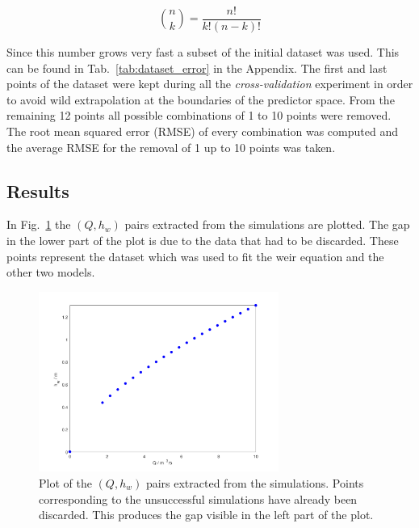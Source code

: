 \begin{equation}
  \binom{n}{k} = \frac{n!}{k!\left(n-k\right)!}
\end{equation}

\noindent Since this number grows very fast a subset of the initial dataset was used.
This can be found in Tab.~\ref{tab:dataset_error} in the Appendix.
The first and last points of the dataset were kept during all the \emph{cross-validation} experiment in order to avoid wild extrapolation at the boundaries of the predictor space.
From the remaining \num{12} points all possible combinations of \num{1} to \num{10} points were removed.
The root mean squared error (RMSE) of every combination was computed and the average RMSE for the removal of \num{1} up to \num{10} points was taken.


\subsection{Results}


In Fig.~\ref{fig:simulations_results} the $(Q, h_w)$ pairs extracted from the simulations are plotted.
The gap in the lower part of the plot is due to the data that had to be discarded.
These points represent the dataset which was used to fit the weir equation and the other two models.

\begin{figure}[h]
  \centering
  \includegraphics[width=0.7\textwidth]{Figures/simulations_results.png}
  \caption{Plot of the $(Q, h_w)$ pairs extracted from the simulations. Points corresponding to the unsuccessful simulations have already been discarded. This produces the gap visible in the left part of the plot.}
  \label{fig:simulations_results}
\end{figure}

